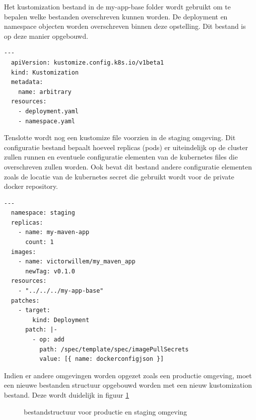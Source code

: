 Het kustomization bestand in de my-app-base folder wordt gebruikt om te bepalen welke bestanden overschreven kunnen worden. De deployment en namespace objecten worden overschreven binnen deze opstelling. Dit bestand is op deze manier opgebouwd.
\newline 

\begin{lstlisting}[style=kubernetesyaml,language=kubernetesyaml]
  ---
  apiVersion: kustomize.config.k8s.io/v1beta1
  kind: Kustomization
  metadata:
    name: arbitrary
  resources:
    - deployment.yaml
    - namespace.yaml 
\end{lstlisting}

\vspace{0.5cm}
Tenslotte wordt nog een kustomize file voorzien in de staging omgeving. Dit configuratie bestand bepaalt hoeveel replicas (pods) er uiteindelijk op de cluster zullen runnen en eventuele configuratie elementen van de kubernetes files die overschreven zullen worden. Ook bevat dit bestand andere configuratie elementen zoals de locatie van de kubernetes secret die gebruikt wordt voor de private docker repository.
\newline

\begin{lstlisting}[style=kubernetesyaml,language=kubernetesyaml]
  ---
  namespace: staging
  replicas:
    - name: my-maven-app
      count: 1
  images:
    - name: victorwillem/my_maven_app
      newTag: v0.1.0
  resources:
    - "../../../my-app-base"
  patches:
    - target:
        kind: Deployment
      patch: |-
        - op: add
          path: /spec/template/spec/imagePullSecrets
          value: [{ name: dockerconfigjson }]
\end{lstlisting}

\vspace{0.5cm}
Indien er andere omgevingen worden opgezet zoals een productie omgeving, moet een nieuwe bestanden structuur opgebouwd worden met een nieuw kustomization bestand. Deze wordt duidelijk in figuur \ref{fig:bestandstructuurnieuw}

\begin{figure}[H]
\caption{\label{fig:bestandstructuurnieuw}bestandstructuur voor productie en staging omgeving}
\end{figure}

